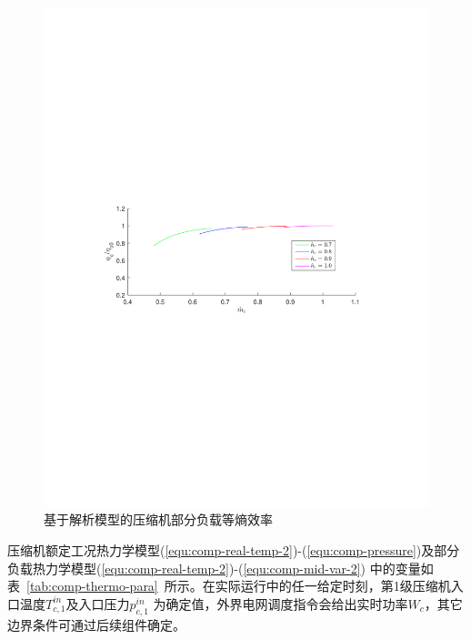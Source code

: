 \begin{figure}[H] %
  \centering
  \includegraphics[scale=0.80]{figures/Chap2-3-Eff-part-load.pdf}
  \caption{基于解析模型的压缩机部分负载等熵效率}
  \label{fig:Eff-part-load}
\end{figure}

压缩机额定工况热力学模型(\ref{equ:comp-real-temp-2})-(\ref{equ:comp-pressure})及部分负载热力学模型(\ref{equ:comp-real-temp-2})-(\ref{equ:comp-mid-var-2}) 中的变量如表~\ref{tab:comp-thermo-para}~所示。在实际运行中的任一给定时刻，第1级压缩机入口温度$T_{c,1}^{in}$及入口压力$p_{c,1}^{in}$ 为确定值，外界电网调度指令会给出实时功率$W_c$，其它边界条件可通过后续组件确定。

